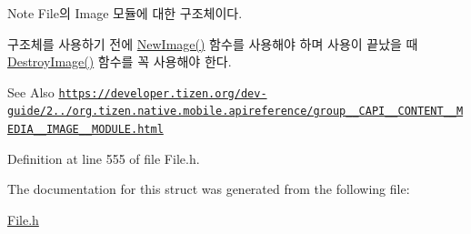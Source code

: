\begin{DoxyNote}{Note}
File의 Image 모듈에 대한 구조체이다. \par
 구조체를 사용하기 전에 \hyperlink{File_8h_a8a073ef272f81217cf7a3665721970a7}{New\-Image()} 함수를 사용해야 하며 사용이 끝났을 때 \hyperlink{File_8h_a4dcf832a1b8f74b72f2fd59b99c53eb6}{Destroy\-Image()} 함수를 꼭 사용해야 한다. 
\end{DoxyNote}
\begin{DoxySeeAlso}{See Also}
\href{https://developer.tizen.org/dev-guide/2.3.0/org.tizen.native.mobile.apireference/group__CAPI__CONTENT__MEDIA__IMAGE__MODULE.html}{\tt https\-://developer.\-tizen.\-org/dev-\/guide/2../org.\-tizen.\-native.\-mobile.\-apireference/group\-\_\-\-\_\-\-C\-A\-P\-I\-\_\-\-\_\-\-C\-O\-N\-T\-E\-N\-T\-\_\-\-\_\-\-M\-E\-D\-I\-A\-\_\-\-\_\-\-I\-M\-A\-G\-E\-\_\-\-\_\-\-M\-O\-D\-U\-L\-E.\-html} 
\end{DoxySeeAlso}


Definition at line 555 of file File.\-h.



The documentation for this struct was generated from the following file\-:\begin{DoxyCompactItemize}
\item 
\hyperlink{File_8h}{File.\-h}\end{DoxyCompactItemize}
